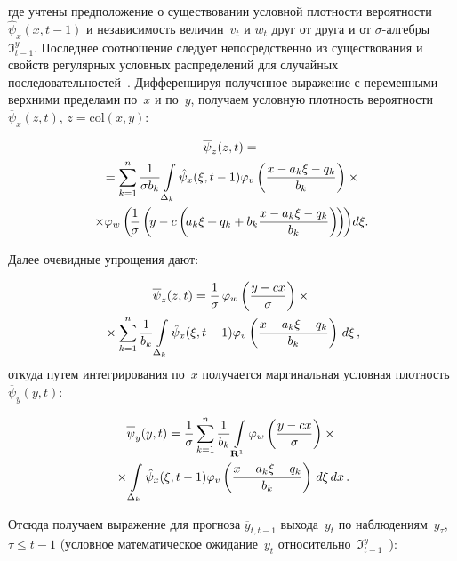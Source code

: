 \begin{multicols}{2}


\noindent
где учтены предположение о существовании условной плотности вероятности 
$\hat{\psi}_x(x,t-1)$ и независимость величин~$v_t$ и $w_t$ друг от друга и от 
\mbox{$\sigma$-алгеб}\-ры~$\Im^y_{t-1}$. Последнее соотношение следует непосредст\-вен\-но из 
существования и свойств регулярных условных распределений для случайных 
последовательностей~\cite{20-b}. Дифференцируя полученное выражение с переменными 
верхними пределами по~$x$ и по~$y$, получаем условную плотность ве\-ро\-ят\-ности 
$\overline{\psi}_x(z,t)$, $z=\mathrm{col}\left( x,y\right)$:

\noindent
\begin{multline*}
\overline{\psi}_z(z,t) ={}\\
{}=\sum\limits_{k=1}^n \displaystyle\frac{\displaystyle 1\mathstrut}{\displaystyle \sigma b_k\mathstrut} \int\limits_{\Delta_k} 
\hat{\psi}_x(\xi,t-1)\varphi_v\left( \displaystyle\frac{\displaystyle x-a_k\xi-q_k\mathstrut}{\displaystyle b_k\mathstrut}\right)\times{}\\
\times \varphi_w\left(\! \displaystyle\frac{\displaystyle 1\mathstrut}{\displaystyle \sigma\mathstrut}\left(\! y-c\left(\! a_k\xi+q_k+b_k\displaystyle\frac{\displaystyle x-a_k\xi-
q_k\mathstrut}{\displaystyle b_k\mathstrut}\right)\!\right)\!\right)\!d\xi.
\end{multline*}

  Далее очевидные упрощения дают:
  
  \noindent
  \begin{multline*}
  \overline{\psi}_z(z,t) =\displaystyle\frac{\displaystyle 1\mathstrut}{\displaystyle \sigma\mathstrut}\,\varphi_w \left( \displaystyle\frac{\displaystyle y-cx\mathstrut}{\displaystyle \sigma\mathstrut}\right) \times{}\\
  {}\times
\sum\limits_{k=1}^n \displaystyle\frac{\displaystyle 1\mathstrut}{\displaystyle b_k\mathstrut} \int\limits_{\Delta_k} \hat{\psi}_x(\xi,t-1)\varphi_v \left( \displaystyle\frac{\displaystyle x-
a_k\xi-q_k\mathstrut}{\displaystyle b_k\mathstrut}\right)\,d\xi\,,
  \end{multline*}
откуда путем интегрирования по~$x$ получается маргинальная условная 
плотность~$\overline{\psi}_y(y,t)$:

\noindent
\begin{multline*}
\overline{\psi}_y (y,t) =\displaystyle\frac{\displaystyle 1\mathstrut}{\displaystyle \sigma\mathstrut}\sum\limits_{k=1}^n \displaystyle\frac{\displaystyle 1\mathstrut}{\displaystyle b_k\mathstrut} 
\int\limits_{\mathbf{R}^1} \varphi_w\left( \displaystyle\frac{\displaystyle y-cx\mathstrut}{\displaystyle \sigma\mathstrut}\right) \times{}\\
{}\times \int\limits_{\Delta_k} 
\hat{\psi}_x(\xi,t-1)\varphi_v\left( \displaystyle\frac{\displaystyle x-a_k\xi-q_k\mathstrut}{\displaystyle b_k\mathstrut}\right) \,d\xi\, dx\,.
\end{multline*}

 
  Отсюда получаем выражение для прогноза $\overline{y}_{t,t-1}$ выхода~$y_t$ по 
наблюдениям~$y_\tau$, $\tau\leq t-1$ (условное математическое ожидание~$y_t$ 
относительно~$\Im^y_{t-1}$~\cite{21-b}):


\end{multicols}
